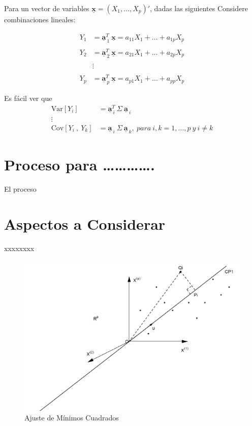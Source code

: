\documentclass[12pt,a4paper,]{book}
\numberwithin{dummy}{section}
\theoremstyle{ocrenumbox}
\theoremstyle{ocrenumbox}
\theoremstyle{ocrenumbox}
\theoremstyle{ocrenumbox}
\theoremstyle{ocrenum}
\begin{document}
Para un vector de variables
\(\underline{\mathbf{x}} = (X_1, \ldots, X_p)'\), dadas las siguientes
Considere combinaciones lineales:

\begin{align}
Y_1 & = \underline{\mathbf{a}}_{\ 1}^T\ \underline{\mathbf{x}} = a_{11}X_1 + \ldots + a_{1p}X_p \nonumber  \\ \nonumber  \\ 
Y_2 & = \underline{\mathbf{a}}_{\ 2}^T\ \underline{\mathbf{x}} = a_{21}X_1 + \ldots + a_{2p}X_p \nonumber  \\  \nonumber  \\  
& \vdots \\ \nonumber  \\ 
Y_p & = \underline{\mathbf{a}}_{\ p}^T\ \underline{\mathbf{x}} = a_{p1}X_1 + \ldots + a_{pp}X_p \nonumber
\end{align}

Es fácil ver que \begin{align}
\text{Var}[Y_i] & = \underline{\mathbf{a}}_{\ i}^T\  \Sigma \ \underline{\mathbf{a}}_{\ i} \nonumber  \\  \vdots \\
\text{Cov}[Y_i\ ,\ Y_k] & = \underline{\mathbf{a}}_{\ i} \ \Sigma\ \underline{\mathbf{a}}_{\ k}, \ para \ i, k = 1, \ldots, p\ y \ i \neq k \nonumber  
\end{align}

\hypertarget{proceso-para-.}{%
\section{Proceso para \ldots\ldots\ldots\ldots.}\label{proceso-para-.}}

El proceso

\hypertarget{aspectos-a-considerar}{%
\section{Aspectos a Considerar}\label{aspectos-a-considerar}}

xxxxxxxx

\begin{figure}[H]

{\centering \includegraphics[width=0.7\linewidth]{Graficas/graf1} 

}

\caption{Ajuste de Mínimos Cuadrados}\label{fig:unnamed-chunk-32}
\end{figure}
\end{document}
